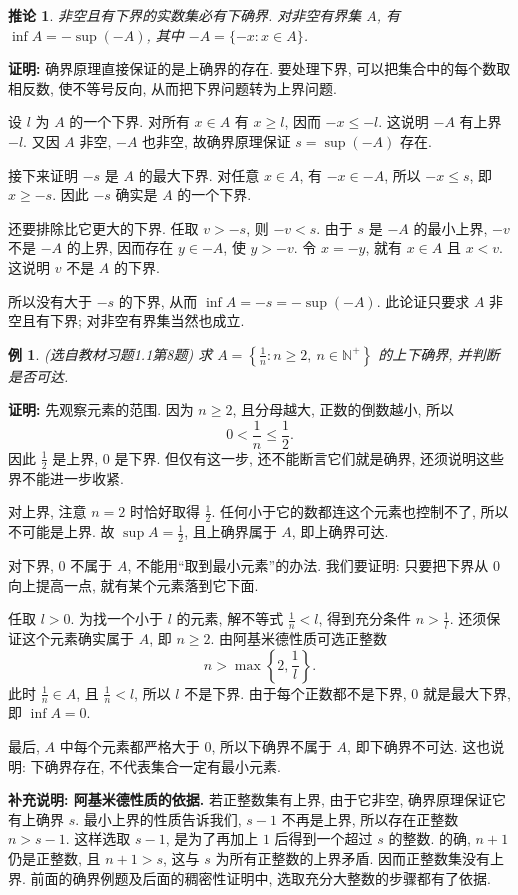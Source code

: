\documentclass[UTF8,openany]{ctexbook}
\theoremstyle{chinesetextbook}
\newtheorem{example}{例}[section]
\newenvironment{cnproof}{\par\indent\textbf{证明:} \ignorespaces}{\par}
\newtheorem*{corollarysingle}{推论}
\begin{document}
\begin{corollarysingle}
非空且有下界的实数集必有下确界. 对非空有界集 $A$, 有 $\inf A=-\sup(-A)$, 其中 $-A=\{-x:x\in A\}$.
\end{corollarysingle}
\begin{cnproof}
确界原理直接保证的是上确界的存在. 要处理下界, 可以把集合中的每个数取相反数, 使不等号反向, 从而把下界问题转为上界问题.

设 $l$ 为 $A$ 的一个下界. 对所有 $x\in A$ 有 $x\ge l$, 因而 $-x\le-l$. 这说明 $-A$ 有上界 $-l$. 又因 $A$ 非空, $-A$ 也非空, 故确界原理保证 $s=\sup(-A)$ 存在.

接下来证明 $-s$ 是 $A$ 的最大下界. 对任意 $x\in A$, 有 $-x\in-A$, 所以 $-x\le s$, 即 $x\ge-s$. 因此 $-s$ 确实是 $A$ 的一个下界.

还要排除比它更大的下界. 任取 $v>-s$, 则 $-v<s$. 由于 $s$ 是 $-A$ 的最小上界, $-v$ 不是 $-A$ 的上界, 因而存在 $y\in-A$, 使 $y>-v$. 令 $x=-y$, 就有 $x\in A$ 且 $x<v$. 这说明 $v$ 不是 $A$ 的下界.

所以没有大于 $-s$ 的下界, 从而 $\inf A=-s=-\sup(-A)$. 此论证只要求 $A$ 非空且有下界; 对非空有界集当然也成立.
\end{cnproof}
\begin{example}
(选自教材习题1.1第8题) 求 $\displaystyle A=\left\{\frac1n:n\ge2,\ n\in\mathbb N^+\right\}$ 的上下确界, 并判断是否可达.
\end{example}
\begin{cnproof}
先观察元素的范围. 因为 $n\ge2$, 且分母越大, 正数的倒数越小, 所以
\[
0<\frac1n\le\frac12.
\]
因此 $\displaystyle\frac12$ 是上界, $0$ 是下界. 但仅有这一步, 还不能断言它们就是确界, 还须说明这些界不能进一步收紧.

对上界, 注意 $n=2$ 时恰好取得 $\displaystyle\frac12$. 任何小于它的数都连这个元素也控制不了, 所以不可能是上界. 故 $\displaystyle\sup A=\frac12$, 且上确界属于 $A$, 即上确界可达.

对下界, $0$ 不属于 $A$, 不能用“取到最小元素”的办法. 我们要证明: 只要把下界从 $0$ 向上提高一点, 就有某个元素落到它下面.

任取 $l>0$. 为找一个小于 $l$ 的元素, 解不等式 $\displaystyle\frac1n<l$, 得到充分条件 $\displaystyle n>\frac1l$. 还须保证这个元素确实属于 $A$, 即 $n\ge2$. 由阿基米德性质可选正整数
\[
n>\max\left\{2,\frac1l\right\}.
\]
此时 $\displaystyle\frac1n\in A$, 且 $\displaystyle\frac1n<l$, 所以 $l$ 不是下界. 由于每个正数都不是下界, $0$ 就是最大下界, 即 $\inf A=0$.

最后, $A$ 中每个元素都严格大于 $0$, 所以下确界不属于 $A$, 即下确界不可达. 这也说明: 下确界存在, 不代表集合一定有最小元素.
\end{cnproof}
\par\indent\textbf{补充说明: 阿基米德性质的依据.} 若正整数集有上界, 由于它非空, 确界原理保证它有上确界 $s$. 最小上界的性质告诉我们, $s-1$ 不再是上界, 所以存在正整数 $n>s-1$. 这样选取 $s-1$, 是为了再加上 $1$ 后得到一个超过 $s$ 的整数. 的确, $n+1$ 仍是正整数, 且 $n+1>s$, 这与 $s$ 为所有正整数的上界矛盾. 因而正整数集没有上界. 前面的确界例题及后面的稠密性证明中, 选取充分大整数的步骤都有了依据.
\end{document}
